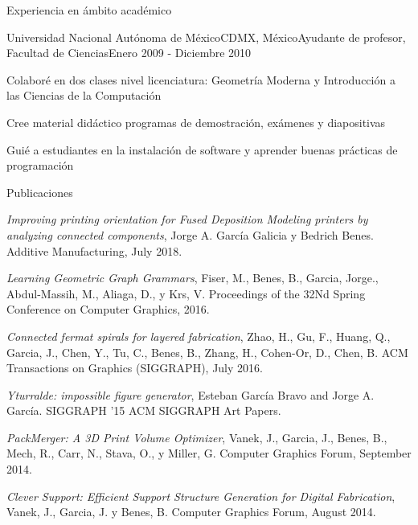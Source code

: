 \documentclass{resume} %
\begin{document}
\begin{rSection}{Experiencia en ámbito académico}
	\begin{rSubsection}{Universidad Nacional Autónoma de México}{CDMX, México}{Ayudante de profesor, Facultad de Ciencias}{Enero 2009 - Diciembre 2010}
	\item Colaboré en dos clases nivel licenciatura: Geometría Moderna y Introducción a las Ciencias de la Computación
	\item Cree material didáctico programas de demostración, exámenes y diapositivas
	\item Guié a estudiantes en la instalación de software y aprender buenas prácticas de programación
	\end{rSubsection}

\end{rSection}

\begin{rSection}{Publicaciones} \itemsep -4pt
\item \textit{Improving printing orientation for Fused Deposition Modeling printers by analyzing connected components}, Jorge A. García Galicia y Bedrich Benes. Additive Manufacturing, July 2018.
\item \textit{Learning Geometric Graph Grammars}, Fiser, M., Benes, B., Garcia, Jorge., Abdul-Massih, M., Aliaga, D., y Krs, V. Proceedings of the 32Nd Spring Conference on Computer Graphics, 2016.
\item \textit{Connected fermat spirals for layered fabrication}, Zhao, H., Gu, F., Huang, Q., Garcia, J., Chen, Y., Tu, C., Benes, B., Zhang, H., Cohen-Or, D., Chen, B. ACM Transactions on Graphics (SIGGRAPH), July 2016.
\item \textit{Yturralde: impossible figure generator}, Esteban García Bravo and Jorge A. García. SIGGRAPH '15 ACM SIGGRAPH Art Papers.
\item \textit{PackMerger: A 3D Print Volume Optimizer}, Vanek, J., Garcia, J., Benes, B., Mech, R., Carr, N., Stava, O., y Miller, G. Computer Graphics Forum, September 2014.
\item \textit{Clever Support: Efficient Support Structure Generation for Digital Fabrication}, Vanek, J., Garcia, J. y Benes, B. Computer Graphics Forum, August 2014.
\end{rSection}

\end{document}
